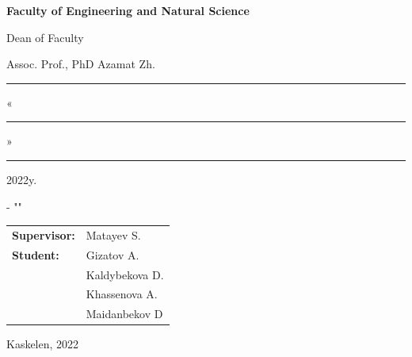\begin{center}
\textbf{Faculty of Engineering and Natural Science}

\def\margin{1cm}
\vspace{2cm}
\normalsize
\begin{flushright}
        Dean of Faculty \hspace*{2.5cm}
        
        Assoc. Prof., PhD Azamat Zh.\hspace*{\margin}
        
        \noindent\rule{6.2cm}{0.4pt} \hspace*{\margin}
        
        «\noindent\rule{1cm}{0.4pt}» \noindent\rule{3cm}{0.4pt} 2022y. \hspace*{\margin}
\end{flushright}

\vspace{2cm}
\huge
\textbf{\diplomaproject}

\vspace{1cm}
\normalsize
\mytitle

\vspace{1cm}
\normalsize
\mydegreecode - "\mydegree"

\vspace{1cm}
\begin{flushright}
        \begin{tabular}{ p{130pt}  l }
            \textbf{Supervisor:} & Matayev S. \\ [0.3cm]
            \textbf{Student:} & Gizatov A.  \\ [0.3cm]
                              & Kaldybekova D. \\ [0.3cm]
                              & Khassenova A. \\ [0.3cm]
                              & Maidanbekov D \\ [0.3cm]
        \end{tabular} \hspace*{\margin}

\end{flushright}

\vfill
Kaskelen, 2022
\end{center}